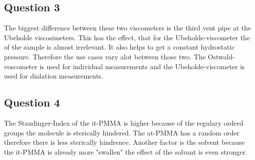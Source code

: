 \documentclass[10pt,a4paper,ngerman]{scrartcl}
\begin{document}
		\subsection{Question 3}

			The biggest difference between these two viscometers is the third vent pipe at the Ubeholde viscosimeters.
			This has the effect, that for the Ubeholde-viscometer the  of the sample is almost irrelevant.
			It also helps to get a constant hydrostatic pressure. 
			Therefore the use cases vary alot between those two. The Ostwald-voscometer is used for individual measurements and the Ubeholde-viscometer is used for dialation measurements.


		\subsection{Question 4}

			The Staudinger-Index of the it-PMMA is higher because of the regulary orderd groups the molecule is sterically hindered. 
			The at-PMMA has a random order therefore there is less sterically hindrence.
			Another factor is the solvent because the it-PMMA is already more "swallen" the effect of the solvant is even stronger. 


		

\printbibliography
\end{document}
